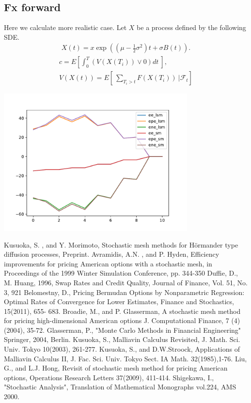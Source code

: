 \documentclass[12pt]{article}
\begin{document}
\subsection{Fx forward}
Here we calculate more realistic case.
Let $X$ be a process defined by the following SDE.
\begin{align}
  X(t) = x \exp\left( (\mu - \frac{1}{2} \sigma^2 )t + \sigma B(t)  \right).
\end{align}
\begin{align}
  c = E\left[\int_0^T  \left(V(X(T_i)) \vee 0 \right) dt \ \right], \\
  V(X(t)) = E\left[\ \sum_{T_i>t}F(X(T_i)) \ | \mathcal{F}_t \right]
\end{align}
\begin{center}
\includegraphics[width=10cm]{figure_1.pdf}
\end{center}
\begin{thebibliography}{99}

Kusuoka, S. , and Y. Morimoto, 
\newblock Stochastic mesh methods for H{\" o}rmander type diffusion processes, 
\newblock Preprint.
Avramidis, A.N. , and P. Hyden, 
\newblock Efficiency improvements for pricing American options 
with a stochastic mesh, 
\newblock in Proceedings of the 1999 Winter Simulation Conference, pp. 344-350
 Duffie, D., M. Huang, 1996,
\newblock  Swap Rates and Credit Quality, 
\newblock Journal of Finance, Vol. 51, No. 3, 921
 Belomestny, D., 
\newblock Pricing Bermudan Options by Nonparametric Regression: 
Optimal Rates of Convergence for Lower Estimates,
\newblock Finance and Stochastics, 15(2011), 655- 683.
 Broadie, M., and P. Glasserman,
\newblock A stochastic mesh method for pricing high-dimensional American options
\newblock J. Computational Finance, 7 (4) (2004), 35-72.
%
  Glasserman, P.,
\newblock "Monte Carlo Methods in Financial Engineering"
\newblock Springer,  2004, Berlin. 
Kusuoka, S.,
\newblock Malliavin Calculus Revisited,
\newblock  J. Math. Sci. Univ. Tokyo 10(2003), 261-277.
%
Kusuoka, S., and D.W.Stroock, 
\newblock Applications of Malliavin Calculus II,
\newblock J. Fac. Sci. Univ. Tokyo Sect. IA Math. 32(1985),1-76.
%
 Liu, G., and L.J. Hong,
\newblock Revisit of stochastic mesh method for pricing American options,
\newblock Operations Research Letters 37(2009), 411-414.
%
Shigekawa, I.,
\newblock "Stochastic Analysis",
\newblock Translation of Mathematical Monographs vol.224,
AMS 2000.
%
\end{thebibliography}
\end{document}
